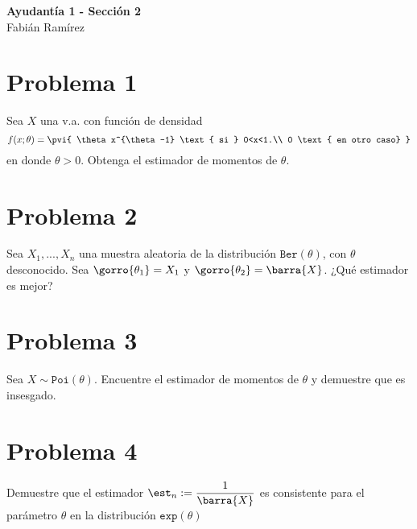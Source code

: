 \begin{center}
    \huge{
    \textbf{
        Ayudantía 1 - Sección 2
    }
    }\\
    \normalsize{
        Fabián Ramírez
    }
\end{center}
\section*{Problema 1}
Sea $X$ una v.a. con función de densidad $$f(x;\theta) = \pvi{
\theta x^{\theta-1} \text{ si } 0<x<1.\\
0 \text{ en otro caso}
}$$ en donde $\theta >0$. Obtenga el estimador de momentos de $\theta$.
\section*{Problema 2}
Sea $X_1, . . . , X_n$ una muestra aleatoria de la distribución
$\texttt{Ber}(\theta)$, con $\theta$ desconocido. Sea $\gorro{\theta_1} = X_1$ y $\gorro{\theta_2} = \barra{X}$. ¿Qué estimador es mejor?
\section*{Problema 3}
Sea $X\sim\texttt{Poi}(\theta)$. Encuentre el estimador de momentos de $\theta$ y demuestre que es insesgado.
\section*{Problema 4}
Demuestre que el estimador $\est_n := \dfrac{1}{\barra{X}}$ es consistente para el parámetro $\theta$ en la distribución $\texttt{exp}(\theta)$